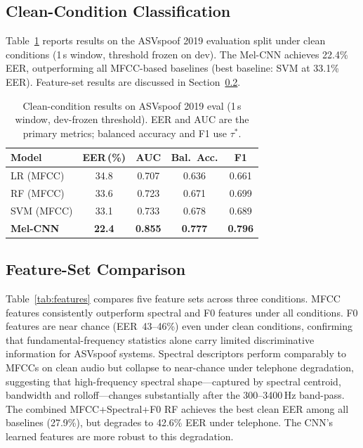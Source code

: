 \documentclass[conference]{IEEEtran}
\begin{document}
\subsection{Clean-Condition Classification}

Table~\ref{tab:clean} reports results on the ASVspoof 2019 evaluation split under clean conditions (1\,s window, threshold frozen on dev). The Mel-CNN achieves 22.4\% EER, outperforming all MFCC-based baselines (best baseline: SVM at 33.1\% EER). Feature-set results are discussed in Section~\ref{sec:features}.

\begin{table}[htbp]
\caption{Clean-condition results on ASVspoof 2019 eval (1\,s window, dev-frozen threshold). EER and AUC are the primary metrics; balanced accuracy and F1 use $\tau^*$.}
\begin{center}
\begin{tabular}{lcccc}
\toprule
\textbf{Model} & \textbf{EER\,(\%)} & \textbf{AUC} & \textbf{Bal.\ Acc.} & \textbf{F1}\\
\midrule
LR (MFCC)              & 34.8 & 0.707 & 0.636 & 0.661\\
RF (MFCC)              & 33.6 & 0.723 & 0.671 & 0.699\\
SVM (MFCC)             & 33.1 & 0.733 & 0.678 & 0.689\\
\textbf{Mel-CNN}       & \textbf{22.4} & \textbf{0.855} & \textbf{0.777} & \textbf{0.796}\\
\bottomrule
\end{tabular}
\label{tab:clean}
\end{center}
\end{table}

\subsection{Feature-Set Comparison}
\label{sec:features}

Table~\ref{tab:features} compares five feature sets across three conditions. MFCC features consistently outperform spectral and F0 features under all conditions. F0 features are near chance (EER~43--46\%) even under clean conditions, confirming that fundamental-frequency statistics alone carry limited discriminative information for ASVspoof systems. Spectral descriptors perform comparably to MFCCs on clean audio but collapse to near-chance under telephone degradation, suggesting that high-frequency spectral shape---captured by spectral centroid, bandwidth and rolloff---changes substantially after the 300--3400\,Hz band-pass. The combined MFCC+Spectral+F0 RF achieves the best clean EER among all baselines (27.9\%), but degrades to 42.6\% EER under telephone. The CNN's learned features are more robust to this degradation.
\end{document}
